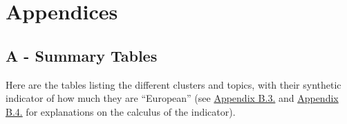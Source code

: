\documentclass[]{elsarticle} %
\newlength{\cslhangindent}
\newlength{\cslentryspacingunit} %
\newenvironment{CSLReferences}[2] %
 {%
  \setlength{\parindent}{0pt}
  \ifodd #1
  \let\oldpar\par
  \def\par{\hangindent=\cslhangindent\oldpar}
  \fi
  \setlength{\parskip}{#2\cslentryspacingunit}
 }%
 {}
\begin{document}
\hypertarget{refs}{}
\begin{CSLReferences}{0}{0}
\end{CSLReferences}

\newpage

\hypertarget{appendices}{%
\section*{Appendices}\label{appendices}}

\hypertarget{a---summary-tables}{%
\subsection*{A - Summary Tables}\label{a---summary-tables}}

Here are the tables listing the different clusters and topics, with
their synthetic indicator of how much they are ``European'' (see
\protect\hyperlink{network}{Appendix B.3.} and
\protect\hyperlink{topic}{Appendix B.4.} for explanations on the
calculus of the indicator).
\end{document}
